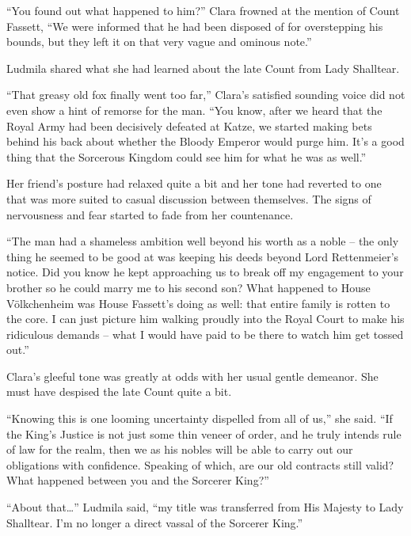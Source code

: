  

“You found out what happened to him?” Clara frowned at the mention of Count Fassett, “We were informed that he had been disposed of for overstepping his bounds, but they left it on that very vague and ominous note.”

 

Ludmila shared what she had learned about the late Count from Lady Shalltear.

 

“That greasy old fox finally went too far,” Clara’s satisfied sounding voice did not even show a hint of remorse for the man. “You know, after we heard that the Royal Army had been decisively defeated at Katze, we started making bets behind his back about whether the Bloody Emperor would purge him. It’s a good thing that the Sorcerous Kingdom could see him for what he was as well.”

 

Her friend’s posture had relaxed quite a bit and her tone had reverted to one that was more suited to casual discussion between themselves. The signs of nervousness and fear started to fade from her countenance.

 

“The man had a shameless ambition well beyond his worth as a noble – the only thing he seemed to be good at was keeping his deeds beyond Lord Rettenmeier’s notice. Did you know he kept approaching us to break off my engagement to your brother so he could marry me to his second son? What happened to House Völkchenheim was House Fassett’s doing as well: that entire family is rotten to the core. I can just picture him walking proudly into the Royal Court to make his ridiculous demands – what I would have paid to be there to watch him get tossed out.”

 

Clara’s gleeful tone was greatly at odds with her usual gentle demeanor. She must have despised the late Count quite a bit.

 

“Knowing this is one looming uncertainty dispelled from all of us,” she said. “If the King’s Justice is not just some thin veneer of order, and he truly intends rule of law for the realm, then we as his nobles will be able to carry out our obligations with confidence. Speaking of which, are our old contracts still valid? What happened between you and the Sorcerer King?”

 

“About that…” Ludmila said, “my title was transferred from His Majesty to Lady Shalltear. I’m no longer a direct vassal of the Sorcerer King.”

